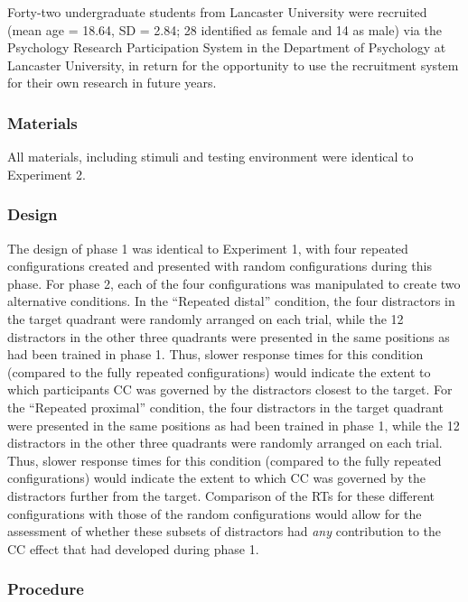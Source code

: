 \documentclass[
  man,
  floatsintext,
  longtable,
  nolmodern,
  notxfonts,
  notimes,
  colorlinks=true,linkcolor=blue,citecolor=blue,urlcolor=blue]{apa7}
\begin{document}
Forty-two undergraduate students from Lancaster University were
recruited (mean age = 18.64, SD = 2.84; 28 identified as female and 14
as male) via the Psychology Research Participation System in the
Department of Psychology at Lancaster University, in return for the
opportunity to use the recruitment system for their own research in
future years.

\subsubsection{Materials}\label{materials-2}

All materials, including stimuli and testing environment were identical
to Experiment 2.

\subsubsection{Design}\label{design-2}

The design of phase 1 was identical to Experiment 1, with four repeated
configurations created and presented with random configurations during
this phase. For phase 2, each of the four configurations was manipulated
to create two alternative conditions. In the ``Repeated distal''
condition, the four distractors in the target quadrant were randomly
arranged on each trial, while the 12 distractors in the other three
quadrants were presented in the same positions as had been trained in
phase 1. Thus, slower response times for this condition (compared to the
fully repeated configurations) would indicate the extent to which
participants CC was governed by the distractors closest to the target.
For the ``Repeated proximal'' condition, the four distractors in the
target quadrant were presented in the same positions as had been trained
in phase 1, while the 12 distractors in the other three quadrants were
randomly arranged on each trial. Thus, slower response times for this
condition (compared to the fully repeated configurations) would indicate
the extent to which CC was governed by the distractors further from the
target. Comparison of the RTs for these different configurations with
those of the random configurations would allow for the assessment of
whether these subsets of distractors had \emph{any} contribution to the
CC effect that had developed during phase 1.

\subsubsection{Procedure}\label{procedure-2}
\end{document}
